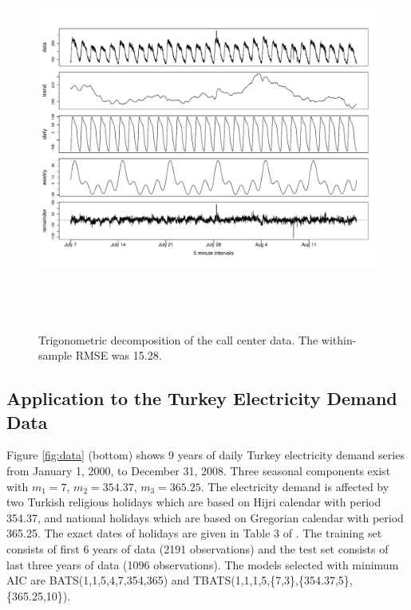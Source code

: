 \documentclass{uwstat572}
\newcommand{\vmadd}[1]{\textbf{\color{red}{#1}}}
\begin{document}
\begin{figure}[]
\centering
  \includegraphics[width=\linewidth,height=5in]{tbatsDecompCalls.pdf}
  \caption{Trigonometric decomposition of the call center data. The within-sample RMSE was 15.28.}
  \label{fig:tbatsDecompCalls}
\end{figure}


\subsection{Application to the Turkey Electricity Demand Data}
\hspace{4ex}Figure \ref{fig:data} (bottom) shows 9 years of daily Turkey electricity demand series from January 1, 2000, to December 31, 2008. Three seasonal components exist with $m_1=7$, $m_2=354.37$, \vmadd{and} $m_3=365.25$. The electricity demand is affected by two Turkish religious holidays which are based on Hijri calendar with period 354.37, and national holidays which are based on Gregorian calendar with period 365.25. The exact dates of holidays are given in Table 3 of \citet{de2011forecasting}. The training set consists of first 6 years of data (2191 observations) and the test set consists of last three years of data (1096 observations). The models selected with minimum AIC are BATS(1,1,5,4,7,354,365) and TBATS(1,1,1,5,\{7,3\},\{354.37,5\},\{365.25,10\}).
\end{document}
